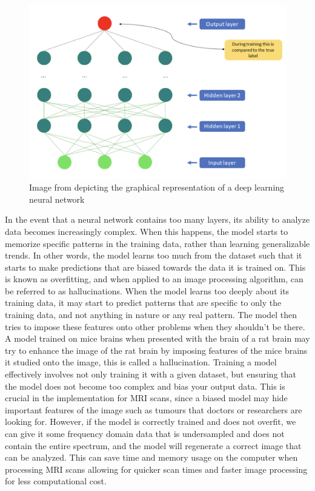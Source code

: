 \documentclass[14pt]{extreport}
\begin{document}
        \begin{figure}[h]
            \begin{center}
                \includegraphics[width = 0.6\linewidth]{Neural Network.png}
                \caption{Image from \cite{Lundervold_Lundervold_2019} depicting the graphical representation of a deep learning neural network}
            \end{center}
        \end{figure}

        In the event that a neural network contains too many layers, its ability to analyze data becomes increasingly complex. When this happens, the model starts to memorize specific patterns in the training data, rather than learning generalizable trends. In other words, the model learns too much from the dataset such that it starts to make predictions that are biased towards the data it is trained on. This is known as overfitting, and when applied to an image processing algorithm, can be referred to as hallucinations. When the model learns too deeply about its training data, it may start to predict patterns that are specific to only the training data, and not anything in nature or any real pattern. The model then tries to impose these features onto other problems when they shouldn't be there. A model trained on mice brains when presented with the brain of a rat brain may try to enhance the image of the rat brain by imposing features of the mice brains it studied onto the image, this is called a hallucination. Training a model effectively involves not only training it with a given dataset, but ensuring that the model does not become too complex and bias your output data. This is crucial in the implementation for MRI scans, since a biased model may hide important features of the image such as tumours that doctors or researchers are looking for. However, if the model is correctly trained and does not overfit, we can give it some frequency domain data that is undersampled and does not contain the entire spectrum, and the model will regenerate a correct image that can be analyzed. This can save time and memory usage on the computer when processing MRI scans allowing for quicker scan times and faster image processing for less computational cost. 
\end{document}
